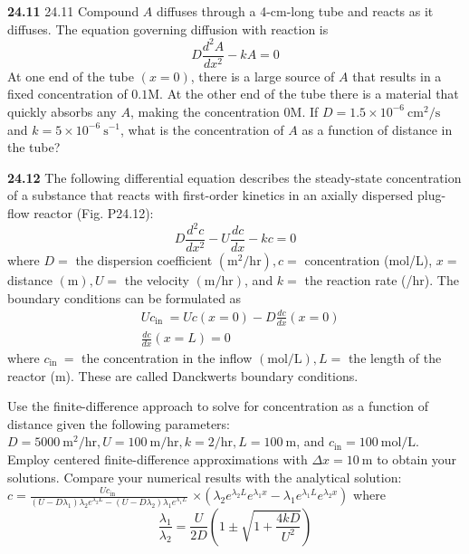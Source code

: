 \documentclass[../main.tex]{subfiles}
\begin{document}
\begin{multicols}{2}
    \noindent\textbf{24.11} 24.11 Compound $A$ diffuses through a 4-cm-long tube and reacts as it diffuses. The equation governing diffusion with reaction is
    $$
    D \frac{d^{2} A}{d x^{2}}-k A=0
    $$
    At one end of the tube $(x=0)$, there is a large source of $A$ that results in a fixed concentration of $0.1 \mathrm{M}$. At the other end of the tube there is a material that quickly absorbs any $A$, making the concentration $0 \mathrm{M}$. If $D=1.5 \times 10^{-6} \mathrm{~cm}^{2} / \mathrm{s}$ and $k=5 \times 10^{-6} \mathrm{~s}^{-1}$, what is the concentration of $A$ as a function of distance in the tube?\vspace{2mm}

    \noindent\textbf{24.12} The following differential equation describes the steady-state concentration of a substance that reacts with first-order kinetics in an axially dispersed plug-flow reactor (Fig. P24.12):
    $$
    D \frac{d^{2} c}{d x^{2}}-U \frac{d c}{d x}-k c=0
    $$
    where $D=$ the dispersion coefficient $\left(\mathrm{m}^{2} / \mathrm{hr}\right), c=$ concentration (mol/L), $x=$ distance $(\mathrm{m}), U=$ the velocity $(\mathrm{m} / \mathrm{hr})$, and $k=$ the reaction rate (/hr). The boundary conditions can be formulated as
    $$
    \begin{aligned}
    &U c_{\text {in }}=U c(x=0)-D \frac{d c}{d x}(x=0) \\
    &\frac{d c}{d x}(x=L)=0
    \end{aligned}
    $$
    where $c_{\text {in }}=$ the concentration in the inflow $(\mathrm{mol} / \mathrm{L}), L=$ the length of the reactor (m). These are called Danckwerts boundary conditions.
    
    Use the finite-difference approach to solve for concentration as a function of distance given the following parameters: $D=5000 \mathrm{~m}^{2} / \mathrm{hr}, U=100 \mathrm{~m} / \mathrm{hr}, k=2 / \mathrm{hr}, L=100 \mathrm{~m}$, and $c_{\mathrm{in}}=100 \mathrm{~mol} / \mathrm{L}$. Employ centered finite-difference approximations with $\Delta x=10 \mathrm{~m}$ to obtain your solutions. Compare your numerical results with the analytical solution:
    $c=\frac{U c_{\text {in }}}{\left(U-D \lambda_{1}\right) \lambda_{2} e^{\lambda_{2} L}-\left(U-D \lambda_{2}\right) \lambda_{1} e^{\lambda_{1} L}}$
    $\times\left(\lambda_{2} e^{\lambda_{2} L} e^{\lambda_{1} x}-\lambda_{1} e^{\lambda_{1} L} e^{\lambda_{2} x}\right)$
    where
    $$
    \frac{\lambda_{1}}{\lambda_{2}}=\frac{U}{2 D}\left(1 \pm \sqrt{1+\frac{4 k D}{U^{2}}}\right)
    $$


\end{multicols}
\end{document}
